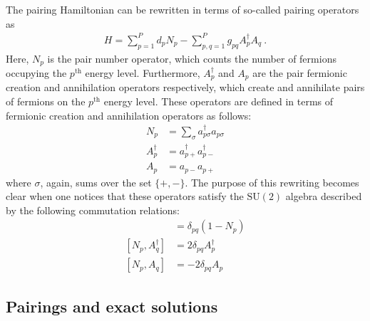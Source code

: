 \documentclass[aps,pre,floatfix,showpacs,twocolumn, preprintnumbers]{revtex4-1}
\begin{document}
The pairing Hamiltonian can be rewritten in terms of so-called pairing operators as
\begin{align}
\label{pairing_model_hamiltonian}
H=\sum_{p=1}^Pd_pN_p-\sum_{p,q=1}^Pg_{pq}A^\dagger_pA_q\ .
\end{align}
Here, $N_p$ is the pair number operator, which counts the number of fermions occupying the $p^{\text{th}}$ energy level. Furthermore, $A^\dagger_p$ and $A_p$ are the pair fermionic creation and annihilation operators respectively, which create and annihilate pairs of fermions on the $p^{\text{th}}$ energy level. These operators are defined in terms of fermionic creation and annihilation operators as follows:
\begin{align}
N_p &= \sum_{\sigma}a^\dagger_{p\sigma}a_{p\sigma}\nonumber
\\
A^{\dagger}_p &= a^{\dagger}_{p+}a^{\dagger}_{p-}\label{pair_fermionic_operators}
\\
A_p &= a_{p-}a_{p+}\nonumber
\end{align}
where $\sigma$, again, sums over the set $\{+,-\}$. The purpose of this rewriting becomes clear when one notices that these operators satisfy the $\text{SU}(2)$ algebra described by the following commutation relations:
\begin{align}
[A_p,A^\dagger_q]&=\delta_{pq}(1-N_p)\nonumber
\\
[N_p,A^\dagger_q]&=2\delta_{pq}A^\dagger_p
\\
[N_p,A_q]&=-2\delta_{pq}A_p\nonumber
\end{align}

\subsection{Pairings and exact solutions}
\end{document}
